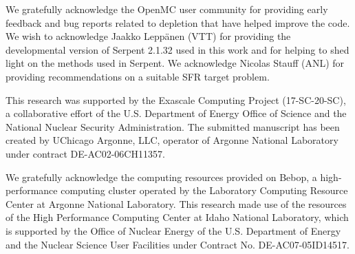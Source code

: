 \documentclass[3p,authoryear]{elsarticle}
\begin{document}
We gratefully acknowledge the OpenMC user community for providing early feedback
and bug reports related to depletion that have helped improve the code. We wish
to acknowledge Jaakko Lepp{\"{a}}nen (VTT) for providing the developmental
version of Serpent 2.1.32 used in this work and for helping to shed light on the
methods used in Serpent. We acknowledge Nicolas Stauff (ANL) for providing
recommendations on a suitable SFR target problem.

This research was supported by the Exascale Computing Project (17-SC-20-SC), a
collaborative effort of the U.S. Department of Energy Office of Science and the
National Nuclear Security Administration. The submitted manuscript has been
created by UChicago Argonne, LLC, operator of Argonne National Laboratory under
contract DE-AC02-06CH11357.

We gratefully acknowledge the computing resources provided on Bebop, a
high-performance computing cluster operated by the Laboratory Computing Resource
Center at Argonne National Laboratory. This research made use of the resources
of the High Performance Computing Center at Idaho National Laboratory, which is
supported by the Office of Nuclear Energy of the U.S. Department of Energy and
the Nuclear Science User Facilities under Contract No. DE-AC07-05ID14517.





\clearpage
\vspace*{\fill}
\noindent{}
\vspace*{\fill}
\end{document}
